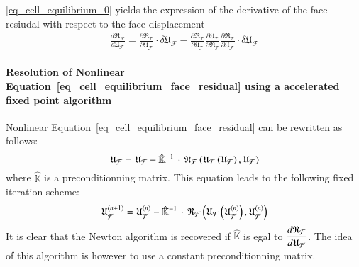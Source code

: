 \eqref{eq_cell_equilibrium_0} yields the expression of the derivative of
the face resiudal with respect to the face displacement
\begin{equation}
  \label{eq_cell_equilibrium_3}
  \begin{aligned}
    \frac{d\mathfrak{R}_{\mathcal{F}}}{d
      \mathfrak{U}_{\mathcal{F}}} = \frac{\partial
      \mathfrak{R}_{\mathcal{T}}}{\partial \mathfrak{U}_{\mathcal{F}}}
    \cdot \delta \mathfrak{U}_{\mathcal{F}} - \frac{\partial
      \mathfrak{R}_{\mathcal{T}}}{\partial \mathfrak{U}_{\mathcal{T}}}
    \frac{\partial \mathfrak{U}_{\mathcal{T}}}{\partial
      \mathfrak{R}_{\mathcal{T}}} \frac{\partial
      \mathfrak{R}_{\mathcal{T}}}{\partial \mathfrak{U}_{\mathcal{F}}}
    \cdot \delta \mathfrak{U}_{\mathcal{F}}
  \end{aligned}
\end{equation}

\paragraph{Resolution of Nonlinear
  Equation~\eqref{eq_cell_equilibrium_face_residual} using a accelerated
  fixed point algorithm} Nonlinear
Equation~\eqref{eq_cell_equilibrium_face_residual} can be rewritten as
follows:
\[
\mathfrak{U}_{\mathcal{F}}=
\mathfrak{U}_{\mathcal{F}}-\hat{\mathbb{K}}^{-1}\,\cdot\,\mathfrak{R}_{\mathcal{F}}\paren{\mathfrak{U}_{\mathcal{T}}\paren{\mathfrak{U}_{\mathcal{F}}},
 \mathfrak{U}_{\mathcal{F}}}
\]
where \(\hat{\mathbb{K}}\) is a preconditionning matrix. This equation leads to the following fixed iteration scheme:
\[
\iter{n+1}{\mathfrak{U}_{\mathcal{F}}}=\iter{n}{\mathfrak{U}_{\mathcal{F}}}
- \hat{\mathbb{K}}^{-1}\,\cdot\,\mathfrak{R}_{\mathcal{F}}\paren{\mathfrak{U}_{\mathcal{T}}\paren{\iter{n}{\mathfrak{U}_{\mathcal{F}}}},
  \iter{n}{\mathfrak{U}_{\mathcal{F}}}}
\]
%
%
%
It is clear that the Newton algorithm is recovered if
\(\hat{\mathbb{K}}\) is egal to
\(\derivtot{\mathfrak{R}_{\mathcal{F}}}{\mathfrak{U}_{\mathcal{F}}}\).
The idea of this algorithm is however to use a constant preconditionning
matrix.

